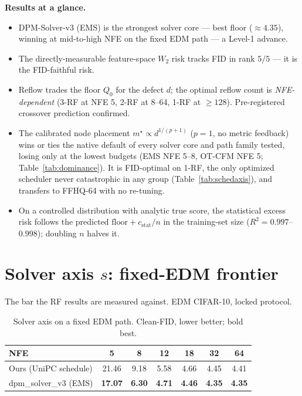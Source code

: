 \documentclass[11pt]{article}
\newcommand{\R}{\mathcal R}
\begin{document}
\noindent\textbf{Results at a glance.}
\begin{itemize}\itemsep2pt
\item[$s$:] DPM-Solver-v3 (EMS) is the strongest solver core --- best floor
($\approx4.35$), winning at mid-to-high NFE on the fixed EDM path --- a
Level-1 advance.
\item[$\R$:] The directly-measurable feature-space $W_2$ risk tracks FID
in rank $5/5$ --- it is the FID-faithful risk.
\item[$P$:] Reflow trades the floor $Q_0$ for the defect $d$; the optimal
reflow count is \emph{NFE-dependent} (3-RF at NFE 5, 2-RF at 8--64, 1-RF at
$\ge128$). Pre-registered crossover prediction confirmed.
\item[$m$:] The calibrated node placement $m^\star\!\propto d^{1/(p+1)}$
($p\!=\!1$, no metric feedback) wins or ties the native default of every
solver core and path family tested, losing only at the lowest budgets (EMS
NFE 5--8, OT-CFM NFE 5; Table~\ref{tab:dominance}). It is FID-optimal on 1-RF,
the only optimized scheduler never catastrophic in any group
(Table~\ref{tab:schedaxis}), and transfers to FFHQ-64 with no re-tuning.
\item[$n$:] On a controlled distribution with analytic true score, the
statistical excess risk follows the predicted $\mathrm{floor}+c_{\mathrm{stat}}/n$
in the training-set size ($R^2\!=\!0.997$--$0.998$); doubling $n$ halves it.
\end{itemize}

\section{Solver axis $s$: fixed-EDM frontier}
\label{sec:solver}
The bar the RF results are measured against. EDM CIFAR-10, locked protocol.

\begin{table}[h]\centering
\caption{Solver axis on a fixed EDM path. Clean-FID, lower better; bold best.}
\label{tab:edm}
\begin{tabular}{lcccccc}
\toprule
NFE & 5 & 8 & 12 & 18 & 32 & 64\\
\midrule
Ours (UniPC schedule) & 21.46 & 9.18 & 5.58 & 4.66 & 4.45 & 4.41\\
dpm\_solver\_v3 (EMS)  & \textbf{17.07} & \textbf{6.30} & \textbf{4.71} & \textbf{4.46} & \textbf{4.35} & \textbf{4.35}\\
\bottomrule
\end{tabular}
\end{table}
\end{document}
